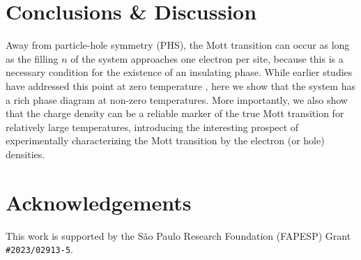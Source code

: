 \documentclass[portrait]{a0poster}
\begin{document}
\begin{paracol}{2}
\vspace{-1.5em}
\section{Conclusions \& Discussion}

\vspace{-0.5em}

Away from particle-hole symmetry (PHS), the Mott transition can occur as long as the filling $n$ of the system approaches one electron per site, because this is a necessary condition for the existence of an insulating phase. While earlier studies have addressed this point at zero temperature \cite{logan2015}, here we show that the system has a rich phase diagram at non-zero temperatures. More importantly, we also show that the charge density can be a reliable marker of the true Mott transition for relatively large temperatures, introducing the interesting prospect of experimentally characterizing the Mott transition by the electron (or hole) densities.

\vspace{-0.5em}
\normalsize



\section*{Acknowledgements}
This work is supported by the São Paulo Research Foundation (FAPESP) Grant \texttt{\#2023/02913-5}.

\end{paracol}
\end{document}

